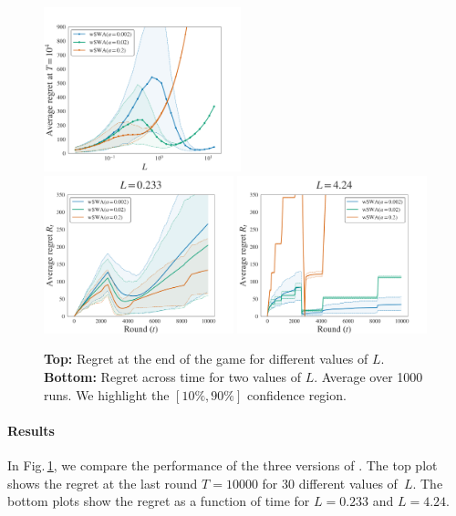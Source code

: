 \begin{figure}[t]
\centering
\includegraphics[clip, width= 0.51\textwidth]{3Rested/fig/fig1A_SWA.pdf}
\includegraphics[clip, width= 0.49\textwidth]{3Rested/fig/fig1B_SWA.pdf}
\includegraphics[clip, width= 0.49\textwidth]{3Rested/fig/fig1C_SWA.pdf}
\caption{\textbf{Top:} Regret at the end of the game for different values of $L$. \textbf{Bottom:} Regret across time for two values of $L$. Average over 1000 runs. We highlight the $\left[10\%, 90\%\right]$ confidence region.}
\label{fig:SWA1}
\end{figure}


\paragraph{Results} 
In Fig.\,\ref{fig:SWA1}, we compare the performance of the three versions of \wSWA. The top plot shows the regret at the last round $T = 10 000$ for 30 different values of~$L$. The bottom plots show the regret as a function of time for $L = 0.233$ and $L=4.24$.  

